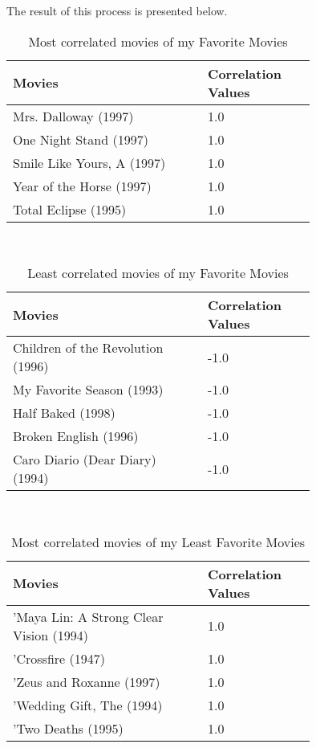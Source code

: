 \documentclass[12pt]{article}
\begin{document}
The result of this process is presented below.
\\
\begin{table}[h]
\centering
\caption{Most correlated movies of my Favorite Movies}
\label{tbl:simple}
\begin{tabular}{p{0.50\linewidth}p{0.25\linewidth}}
\hline
\textbf{Movies} & \textbf{Correlation Values} \\ \hline \hline
Mrs. Dalloway (1997) & 1.0 \\ \hline
One Night Stand (1997) & 1.0 \\ \hline
Smile Like Yours, A (1997) & 1.0 \\ \hline
Year of the Horse (1997) & 1.0 \\ \hline
Total Eclipse (1995) & 1.0 \\ \hline
\hline
\end{tabular}
\end{table}
\\
\begin{table}[h]
\centering
\caption{Least correlated movies of my Favorite Movies}
\label{tbl:simple}
\begin{tabular}{p{0.50\linewidth}p{0.25\linewidth}}
\hline
\textbf{Movies} & \textbf{Correlation Values} \\ \hline \hline
Children of the Revolution (1996) & -1.0 \\ \hline
My Favorite Season (1993) & -1.0 \\ \hline
Half Baked (1998) & -1.0 \\ \hline
Broken English (1996) & -1.0 \\ \hline
Caro Diario (Dear Diary) (1994) & -1.0 \\ \hline
\hline
\end{tabular}
\end{table}
\\
\begin{table}[h]
\centering
\caption{Most correlated movies of my Least Favorite Movies}
\label{tbl:simple}
\begin{tabular}{p{0.50\linewidth}p{0.25\linewidth}}
\hline
\textbf{Movies} & \textbf{Correlation Values} \\ \hline \hline
'Maya Lin: A Strong Clear Vision (1994) & 1.0 \\ \hline
'Crossfire (1947) & 1.0 \\ \hline
'Zeus and Roxanne (1997) & 1.0 \\ \hline
'Wedding Gift, The (1994) & 1.0 \\ \hline
'Two Deaths (1995) & 1.0 \\ \hline
\hline
\end{tabular}
\end{table}
\end{document}
